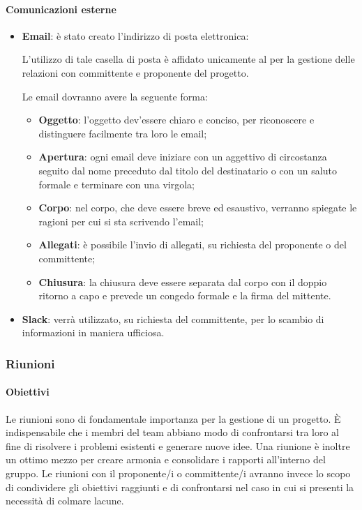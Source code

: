 \paragraph{Comunicazioni esterne}
\begin{itemize}
\item\textbf{Email}: è stato creato l'indirizzo di posta elettronica:
\textbf{\emailgruppo}

L'utilizzo di tale casella di posta è affidato unicamente al \RdP{} per la gestione delle relazioni con committente e proponente del progetto.

Le email dovranno avere la seguente forma:
	\begin{itemize}
	\item\textbf{Oggetto}: l'oggetto dev'essere chiaro e conciso, per riconoscere e distinguere facilmente tra loro le email;
	\item\textbf{Apertura}: ogni email deve iniziare con un aggettivo di circostanza seguito dal nome preceduto dal titolo del destinatario o con un saluto formale e terminare con una virgola;
	\item\textbf{Corpo}: nel corpo, che deve essere breve ed esaustivo, verranno spiegate le ragioni per cui si sta scrivendo l'email;
	\item\textbf{Allegati}: è possibile l'invio di allegati, su richiesta del proponente o del committente;
	\item\textbf{Chiusura}: la chiusura deve essere separata dal corpo con il doppio ritorno a capo e prevede un congedo formale e la firma del mittente.
	\end{itemize}

\item\textbf{Slack}: verrà utilizzato, su richiesta del committente, per lo scambio di informazioni in maniera ufficiosa.
\end{itemize}

\subsubsection{Riunioni}
\paragraph{Obiettivi}
Le riunioni sono di fondamentale importanza per la gestione di un progetto. È indispensabile che i membri del team abbiano
modo di confrontarsi tra loro al fine di risolvere i problemi esistenti e generare nuove idee. Una riunione è inoltre un
ottimo mezzo per creare armonia e consolidare i rapporti all'interno del gruppo. Le riunioni con il proponente/i o committente/i avranno invece lo scopo di condividere gli obiettivi raggiunti e di confrontarsi nel caso in cui si presenti
la necessità di colmare lacune. 
